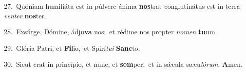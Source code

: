 {\numbfont\textcolor{\numbcolor}{27.}}~Quóniam humiliáta est in púlvere ánima \textbf{nos}\-tra:~\star conglutinátus est in terra \textit{ven}\-\textit{ter} \textbf{nos}\-ter.\par
{\numbfont\textcolor{\numbcolor}{28.}}~Exsúrge, Dómine, ádju\textbf{va} nos:~\star et rédime nos propter \textit{no}\-\textit{men} \textbf{tu}\-um.\par
{\numbfont\textcolor{\numbcolor}{29.}}~Glória Patri, et \textbf{Fí}\-lio,~\star et Spirí\-\textit{tu}\-\textit{i} \textbf{Sanc}\-to.\par
{\numbfont\textcolor{\numbcolor}{30.}}~Sicut erat in princípio, et nunc, et \textbf{sem}\-per,~\star et in sǽcula sæcu\-\textit{ló}\-\textit{rum}. \textbf{A}\-men.\par
